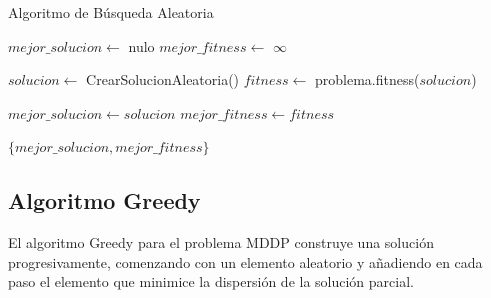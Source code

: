 \documentclass{article}
\begin{document}
\begin{algorithm}
\caption{Algoritmo de Búsqueda Aleatoria}
\begin{algorithmic}[1]
    \State $mejor\_solucion \gets$ nulo
    \State $mejor\_fitness \gets$ $\infty$
    
        \State $solucion \gets$ CrearSolucionAleatoria()
        \State $fitness \gets$ problema.fitness($solucion$)
        
            \State $mejor\_solucion \gets solucion$
            \State $mejor\_fitness \gets fitness$
        \EndIf
    \EndFor
    
    \State \Return $\{mejor\_solucion, mejor\_fitness\}$
\EndFunction
\end{algorithmic}
\end{algorithm}

\newpage

\subsection{Algoritmo Greedy}

El algoritmo Greedy para el problema MDDP construye una solución progresivamente, comenzando con un elemento aleatorio y añadiendo en cada paso el elemento que minimice la dispersión de la solución parcial.
\end{document}
